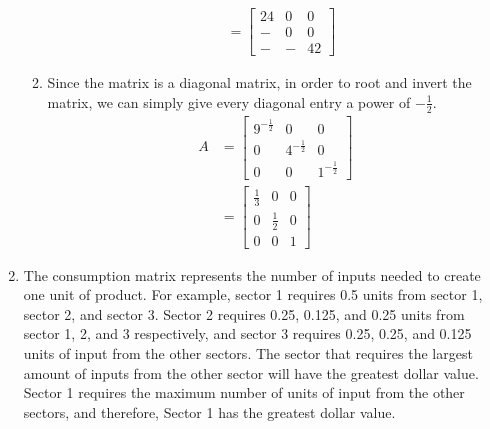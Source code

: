\documentclass[11pt, letterpaper, twoside]{article}
\begin{document}
\begin{enumerate}
\begin{enumerate}[label=(\alph*)]
\begin{align*}
 &=\begin{bmatrix}
24 & 0 & 0\\
- & 0 & 0\\
- & - & 42
\end{bmatrix}
\end{align*}
\item Since the matrix is a diagonal matrix, in order to root and invert the matrix, we can simply give every diagonal entry a power of $-\frac{1}{2}$.%
\begin{align*}
A&=\begin{bmatrix}
9^{-\frac{1}{2}} & 0 & 0\\
0 & 4^{-\frac{1}{2}} & 0\\
0 & 0 & 1^{-\frac{1}{2}}
\end{bmatrix}\\
&=\begin{bmatrix}
\frac{1}{3} & 0 & 0\\
0 & \frac{1}{2} & 0\\
0 & 0 & 1
\end{bmatrix}
\end{align*}
\end{enumerate}
\item The consumption matrix represents the number of inputs needed to create one unit of product. For example, sector 1 requires 0.5 units from sector 1, sector 2, and sector 3. Sector 2 requires 0.25, 0.125, and 0.25 units from sector 1, 2, and 3 respectively, and sector 3 requires 0.25, 0.25, and 0.125 units of input from the other sectors. The sector that requires the largest amount of inputs from the other sector will have the greatest dollar value. Sector 1 requires the maximum number of units of input from the other sectors, and therefore, Sector 1 has the greatest dollar value.


\end{enumerate}
\end{document}
